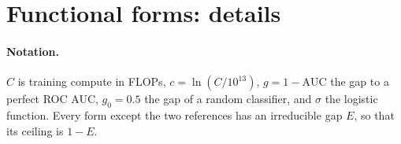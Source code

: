 
\section{Functional forms: details}
\label{app:functional-forms}

\paragraph{Notation.}
$C$ is training compute in FLOPs, $c=\ln(C/10^{13})$, $g=1-\text{AUC}$ the gap to a perfect ROC AUC, $g_0=0.5$ the gap
of a random classifier, and $\sigma$ the logistic function. Every form except the two references has an irreducible
gap $E$, so that its ceiling is $1-E$.

